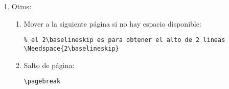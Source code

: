 \begin{enumerate}
\item Otros:
\begin{enumerate}
	\item Mover a la siguiente página si no hay espacio disponible:
	\begin{lstlisting}
% el 2\baselineskip es para obtener el alto de 2 lineas
\Needspace{2\baselineskip}
	\end{lstlisting}
	
	\item Salto de página:
	\begin{lstlisting}
\pagebreak
	\end{lstlisting}
	
\end{enumerate}

\end{enumerate}